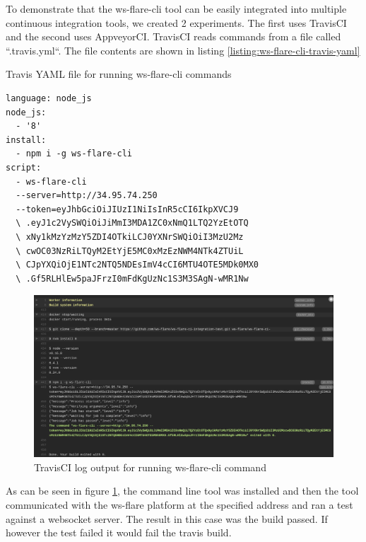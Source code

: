To demonstrate that the ws-flare-cli tool can be easily integrated into multiple continuous integration tools, we created 2 experiments. The first uses TravisCI and the second uses AppveyorCI. TravisCI reads commands from a file called ``.travis.yml``. The file contents are shown in listing \ref{listing:ws-flare-cli-travis-yaml}

\begin{listing}[H]
    \caption{Travis YAML file for running ws-flare-cli commands}
    \label{listing:ws-flare-cli-travis-yaml}
    \begin{verbatim}
language: node_js
node_js:
  - '8'
install:
  - npm i -g ws-flare-cli
script:
  - ws-flare-cli 
  --server=http://34.95.74.250 
  --token=eyJhbGciOiJIUzI1NiIsInR5cCI6IkpXVCJ9
  \ .eyJ1c2VySWQiOiJiMmI3MDA1ZC0xNmQ1LTQ2YzEtOTQ
  \ xNy1kMzYzMzY5ZDI4OTkiLCJ0YXNrSWQiOiI3MzU2Mz
  \ cwOC03NzRiLTQyM2EtYjE5MC0xMzEzNWM4NTk4ZTUiL
  \ CJpYXQiOjE1NTc2NTQ5NDEsImV4cCI6MTU4OTE5MDk0MX0
  \ .Gf5RLHlEw5paJFrzI0mFdKgUzNc1S3M3SAgN-wMR1Nw
\end{verbatim}
\end{listing}

\begin{figure}[H]
  \centering
    \includegraphics[width=1\textwidth]{figures/experiments/experiment-3/travis-output.png}
    \caption{TravisCI log output for running ws-flare-cli command}
    \label{fig:experiment-3-travis-log}
\end{figure}

As can be seen in figure \ref{fig:experiment-3-travis-log}, the command line tool was installed and then the tool communicated with the ws-flare platform at the specified address and ran a test against a websocket server. The result in this case was the build passed. If however the test failed it would fail the travis build. 

